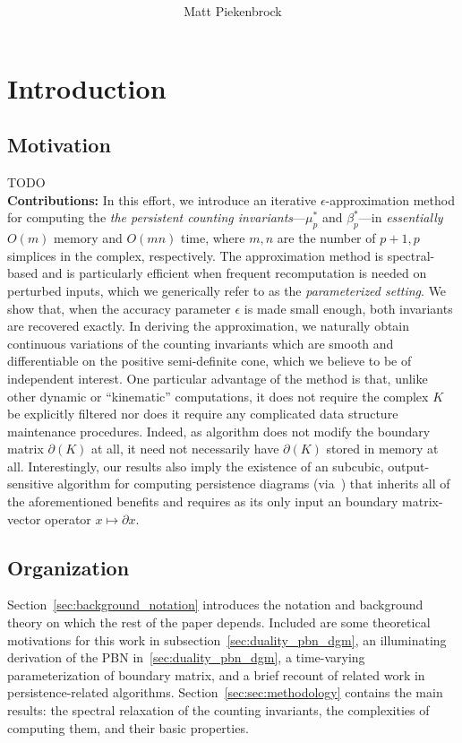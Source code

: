 \documentclass[10pt]{article}
\title{\vspace{-2.0em} \vspace{-0.5em}}
\author{Matt Piekenbrock}
\date{}
\numberwithin{equation}{section}
\newcommand{\+}{%
	\raisebox{0.18ex}{\scaleobj{0.55}{+}}
}
\theoremstyle{definition}
\begin{document}
\noindent



\section{Introduction}
\subsection*{Motivation} TODO 
%
\\
\noindent 
\textbf{Contributions: }
In this effort, we introduce an iterative $\epsilon$-approximation method for computing the \emph{the persistent counting invariants}---$\mu_p^{\ast}$ and $\beta_p^\ast$---in \emph{essentially} $O(m)$ memory and $O(mn)$ time, where $m, n$ are the number of $p+1, p$ simplices in the complex, respectively. 
The approximation method is spectral-based and is particularly efficient when frequent recomputation is needed on perturbed inputs, which we generically refer to as the \emph{parameterized setting}. 
We show that, when the accuracy parameter $\epsilon$ is made small enough, both invariants are recovered exactly. 
In deriving the approximation, we naturally obtain continuous variations of the counting invariants which are smooth and differentiable on the positive semi-definite cone, which we believe to be of independent interest. 
One particular advantage of the method is that, unlike other dynamic or ``kinematic'' computations, it does not require the complex $K$ be explicitly filtered nor does it require any complicated data structure maintenance procedures.
Indeed, as algorithm does not modify the boundary matrix $\partial(K)$ at all, it need not necessarily have $\partial(K)$ stored in memory at all.
Interestingly, our results also imply the existence of an subcubic, output-sensitive algorithm for computing persistence diagrams (via~\cite{chen2011output}) that inherits all of the aforementioned benefits and requires as its only input an boundary matrix-vector operator $x \mapsto \partial x$. 

\subsection{Organization}
Section~\ref{sec:background_notation} introduces the notation and background theory on which the rest of the paper depends. Included are some theoretical motivations for this work in subsection~\ref{sec:duality_pbn_dgm}, an illuminating derivation of the PBN in~\ref{sec:duality_pbn_dgm}, a time-varying parameterization of boundary matrix, and a brief recount of related work in persistence-related algorithms.
Section~\ref{sec:sec:methodology} contains the main results: the spectral relaxation of the counting invariants, the complexities of computing them, and their basic properties.
  
\end{document}
